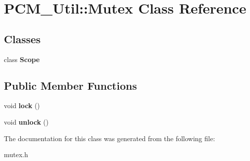\section{P\+C\+M\+\_\+\+Util\+:\+:Mutex Class Reference}
\label{classPCM__Util_1_1Mutex}
\subsection*{Classes}
\begin{DoxyCompactItemize}
\item 
class \textbf{ Scope}
\end{DoxyCompactItemize}
\subsection*{Public Member Functions}
\begin{DoxyCompactItemize}
\item 
\mbox{\label{classPCM__Util_1_1Mutex_a04424b15dade04beb61030d077e20bc5}} 
void {\bfseries lock} ()
\item 
\mbox{\label{classPCM__Util_1_1Mutex_a0ed943ad319ecdbac0a8bb0072c0fdfb}} 
void {\bfseries unlock} ()
\end{DoxyCompactItemize}


The documentation for this class was generated from the following file\+:\begin{DoxyCompactItemize}
\item 
mutex.\+h\end{DoxyCompactItemize}
